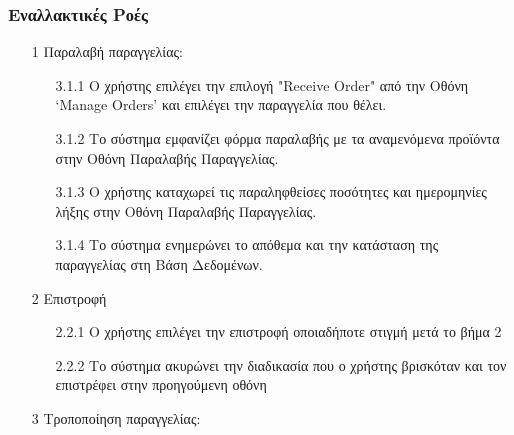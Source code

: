 \documentclass[12pt,a4paper,twoside]{book}
\begin{document}
\subsubsection{Εναλλακτικές Ροές}
\begin{enumerate}
  \item[1 ] Παραλαβή παραγγελίας:
        \begin{enumerate}
          \item[3.1.1 ] Ο χρήστης επιλέγει την επιλογή "Receive Order" από την Οθόνη `Manage Orders' και επιλέγει την παραγγελία που θέλει. %
          \item[3.1.2 ] Το σύστημα εμφανίζει φόρμα παραλαβής με τα αναμενόμενα προϊόντα στην Οθόνη Παραλαβής Παραγγελίας.
          \item[3.1.3 ] Ο χρήστης καταχωρεί τις παραληφθείσες ποσότητες και ημερομηνίες λήξης στην Οθόνη Παραλαβής Παραγγελίας.
          \item[3.1.4 ] Το σύστημα ενημερώνει το απόθεμα και την κατάσταση της παραγγελίας στη Βάση Δεδομένων. %
        \end{enumerate}
  \item[2 ] Επιστροφή
        \begin{enumerate}
          \item[2.2.1 ] Ο χρήστης επιλέγει την επιστροφή οποιαδήποτε στιγμή μετά το βήμα 2 %
          \item[2.2.2 ] Το σύστημα ακυρώνει την διαδικασία που ο χρήστης βρισκόταν και τον επιστρέφει στην προηγούμενη οθόνη %
        \end{enumerate}
  \item[3 ] Τροποποίηση παραγγελίας:

\end{enumerate}
\end{document}
